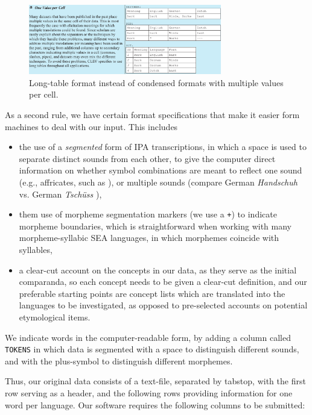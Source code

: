 \documentclass[xetex,svgnames]{scrartcl}
\begin{document}
\begin{figure}[htb]
  \centering
  \includegraphics[width=0.75\textwidth]{one-value-per-cell.png}
  \caption{Long-table format instead of condensed formats with multiple values per cell.}
  \label{fig:onevalue}
\end{figure}

As a second rule, we have certain format specifications that make it easier form machines to deal
with our input. This includes

\begin{itemize}
  \item the use of a \emph{segmented} form of IPA transcriptions, in which a space is used to
    separate distinct sounds from each other, to give the computer direct information on whether
    symbol combinations are meant to reflect one sound (e.g., affricates, such as {\sil [ts, tʃ]}),
    or multiple sounds (compare German \emph{Handschuh} {\sil [h a n t ʃ uː]} vs. German
    \emph{Tschüss} {\sil [tʃ y s]}),
  \item them use of morpheme segmentation markers (we use a \texttt{+}) to indicate morpheme
    boundaries, which is straightforward when working with many morpheme-syllabic SEA languages, in
    which morphemes coincide with syllables,
  \item a clear-cut account on the concepts in our data, as they serve as the initial comparanda, so
    each concept needs to be given a clear-cut definition, and our preferable starting points are
    concept lists which are translated into the languages to be investigated, as opposed to
    pre-selected accounts on potential etymological items.

\end{itemize}

We indicate words in the computer-readable form, by adding a column called \texttt{TOKENS} in which
data is segmented with a space to distinguish different sounds, and with the plus-symbol to
distinguish different morphemes. 

Thus, our original data consists of a text-file, separated by tabstop, with the first row serving as
a header, and the following rows providing information for one word per language. Our software
requires the following columns to be submitted:
\end{document}
